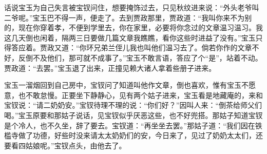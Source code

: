 


\begin{parag}
    话说宝玉为自己失言被宝钗问住，想要掩饰过去，只见秋纹进来说：“外头老爷叫二爷呢。”宝玉巴不得一声，便走了。去到贾政那里，贾政道：“我叫你来不为别的，现在你穿着孝，不便到学里去，你在家里，必要将你念过的文章温习温习。我这几天倒也闲着，隔两三日要做几篇文章我瞧瞧，看你这些时进益了没有。”宝玉只得答应着。贾政又道：“你环兄弟兰侄儿我也叫他们温习去了。倘若你作的文章不好，反倒不及他们，那可就不成事了。”宝玉不敢言语，答应了个“是”，站着不动。贾政道：“去罢。”宝玉退了出来，正撞见赖大诸人拿着些册子进来。
\end{parag}


\begin{parag}
    宝玉一溜烟回到自己房中，宝钗问了知道叫他作文章，倒也喜欢，惟有宝玉不愿意，也不敢怠慢。正要坐下静静心，见有两个姑子进来，宝玉看是地藏庵的，来和宝钗说：“请二奶奶安。”宝钗待理不理的说：“你们好？”因叫人来：“倒茶给师父们喝。”宝玉原要和那姑子说话，见宝钗似乎厌恶这些，也不好兜搭。那姑子知道宝钗是个冷人，也不久坐，辞了要去。宝钗道：“再坐坐去罢。”那姑子道：“我们因在铁槛寺做了功德，好些时没来请太太奶奶们的安，今日来了，见过了奶奶太太们，还要看四姑娘呢。”宝钗点头，由他去了。
\end{parag}


